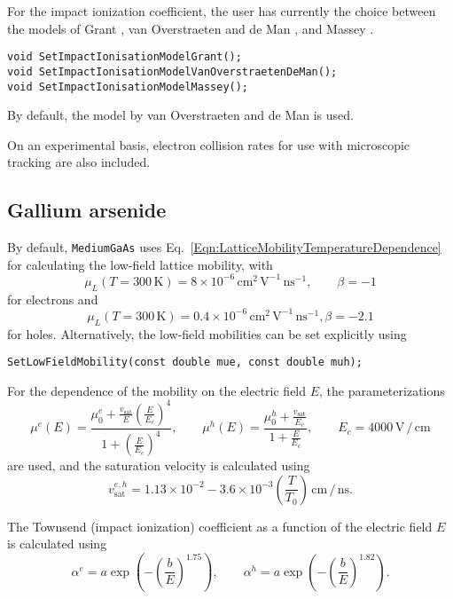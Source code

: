 For the impact ionization coefficient, the user has currently the choice 
between the models of Grant \cite{Grant1973},
van Overstraeten and de Man \cite{VanOverstraeten1970}, and Massey 
\cite{Massey2006}.
\begin{lstlisting}
void SetImpactIonisationModelGrant();
void SetImpactIonisationModelVanOverstraetenDeMan();
void SetImpactIonisationModelMassey();
\end{lstlisting}
By default, the model by van Overstraeten and de Man is used.

On an experimental basis, electron collision rates for use with microscopic tracking 
are also included.
 
\subsection{Gallium arsenide}
By default, \texttt{MediumGaAs} uses 
Eq.~\eqref{Eqn:LatticeMobilityTemperatureDependence} for calculating the 
low-field lattice mobility, with 
\begin{equation*}
\mu_{L}\left(T = 300\,\text{K}\right) = 8\times10^{-6}\,\text{cm}^{2}\,\text{V}^{-1}\,\text{ns}^{-1}, \qquad \beta=-1
\end{equation*}
for electrons and 
\begin{equation*}
\mu_{L}\left(T = 300\,\text{K}\right) = 0.4\times10^{-6}\,\text{cm}^{2}\,\text{V}^{-1}\,\text{ns}^{-1}, \beta=-2.1
\end{equation*}
for holes. Alternatively, the low-field mobilities can be set explicitly using
\begin{lstlisting}
SetLowFieldMobility(const double mue, const double muh);
\end{lstlisting}
For the dependence of the mobility on the electric field $E$, the 
parameterizations \cite{Barnes1976} 
\begin{equation*}
  \mu^{e}\left(E\right) = \frac{\mu_{0}^{e} + \frac{v_{\text{sat}}}{E}\left(\frac{E}{E_{c}}\right)^{4}}{1 + \left(\frac{E}{E_{c}}\right)^4}, \qquad
  \mu^{h}\left(E\right) = \frac{\mu_{0}^{h} + \frac{v_{\text{sat}}}{E_{c}}}{1 + \frac{E}{E_{c}}}, \qquad E_{c} = 4000\,\text{V}\,/\,\text{cm}
\end{equation*}
are used, and the saturation velocity is calculated using
\begin{equation*}
  v_{\text{sat}}^{e,h} = 1.13\times10^{-2} - 3.6\times10^{-3}\left(\frac{T}{T_{0}}\right)\,\text{cm}\,/\,\text{ns}. 
\end{equation*}

The Townsend (impact ionization) coefficient as a function of the 
electric field $E$ is calculated using
\begin{equation*}
  \alpha^{e} = a \exp\left(-\left(\frac{b}{E}\right)^{1.75}\right), \qquad
  \alpha^{h} = a \exp\left(-\left(\frac{b}{E}\right)^{1.82}\right).
\end{equation*} 
